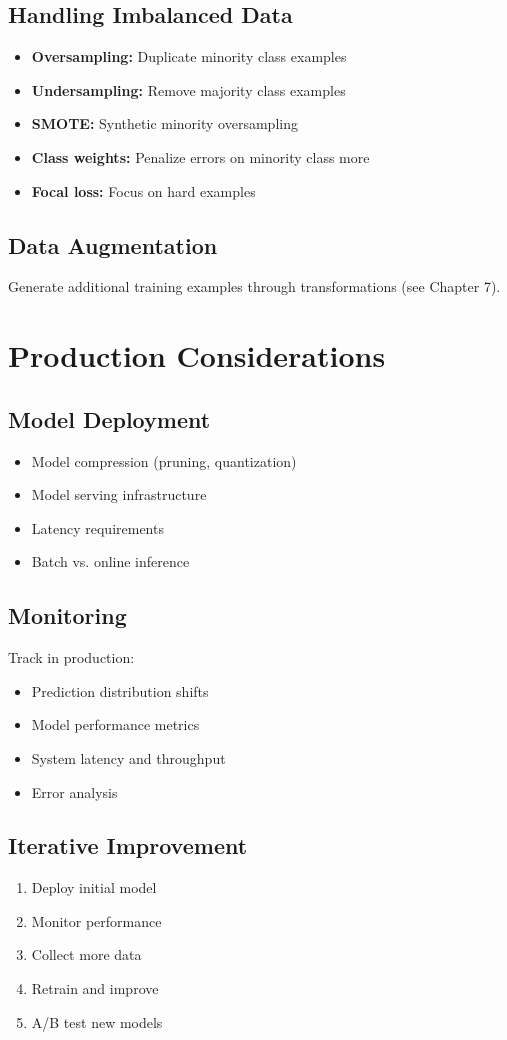 \subsection{Handling Imbalanced Data}

\begin{itemize}
    \item \textbf{Oversampling:} Duplicate minority class examples
    \item \textbf{Undersampling:} Remove majority class examples
    \item \textbf{SMOTE:} Synthetic minority oversampling
    \item \textbf{Class weights:} Penalize errors on minority class more
    \item \textbf{Focal loss:} Focus on hard examples
\end{itemize}

\subsection{Data Augmentation}

Generate additional training examples through transformations (see Chapter 7).

\section{Production Considerations}
\label{sec:production}

\subsection{Model Deployment}

\begin{itemize}
    \item Model compression (pruning, quantization)
    \item Model serving infrastructure
    \item Latency requirements
    \item Batch vs. online inference
\end{itemize}

\subsection{Monitoring}

Track in production:
\begin{itemize}
    \item Prediction distribution shifts
    \item Model performance metrics
    \item System latency and throughput
    \item Error analysis
\end{itemize}

\subsection{Iterative Improvement}

\begin{enumerate}
    \item Deploy initial model
    \item Monitor performance
    \item Collect more data
    \item Retrain and improve
    \item A/B test new models
\end{enumerate}
